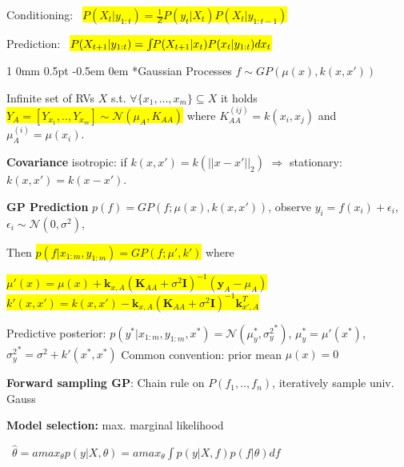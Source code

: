 \documentclass[11pt,landscape,a4paper,fleqn]{article}
\makeatletter
\newcommand*{\rsection}{%
	\@startsection{section}%
	{1}%
	{0mm}%
	{0.5pt}%
	{-0.5em \@plus 0em}
	{\color{myorange}\sffamily\small\bfseries}}
\newcommand{\mhl}[1]{\setlength{\fboxsep}{0pt}\colorbox{yellow}{#1}}
\makeatother
\begin{document}
\begin{multicols*}{4}
		Conditioning:
		\mbox{\fontsize{9}{6}\selectfont
			\mhl{$P(X_t | y_{1:t}) = \frac{1}{Z} P(y_t | X_t) P(X_t | y_{1:t-1})$}
		}

		Prediction:
		\mbox{\fontsize{9}{6}\selectfont
			\mhl{$P(X_{t+1} | y_{1:t}) = \int \hspace*{-1mm} P(X_{t+1} | x_t) P(x_t | y_{1:t}) dx_t$}
		}

		\rsection*{Gaussian Processes} $f \sim GP(\mu(x), k(x, x'))$ %

		Infinite set of RVs $X$ s.t. $\forall \{x_1, \dots, x_m\} \subseteq X$
		it holds \mhl{$Y_A = [Y_{x_1},..,Y_{x_m}] \sim \mathcal{N}(\mu_A, K_{AA})$} where
	$K_{AA}^{(ij)} = k(x_i, x_j)$ and $\mu_A^{(i)} = \mu(x_i)$.


		\textbf{Covariance} %
		isotropic: if $k(x,x') = k(||x - x'||_2)$ $\Rightarrow$ stationary: $k(x,x') = k(x - x')$.



		\textbf{GP Prediction} $p(f) = GP(f; \mu(x), k(x,x'))$, observe $y_i = f(x_i) + \epsilon_i$, $\epsilon_i \sim \mathcal{N}(0, \sigma^2)$,


		Then \mhl{$p(f | x_{1:m}, y_{1:m}) = GP(f; \mu', k')$} where

		\mhl{$\mu'(x) = \mu(x) + \mathbf{k}_{x,A} (\mathbf{K}_{AA} + \sigma^2 \mathbf{I})^{-1} (\mathbf{y}_A - \mu_A)$}
		\mhl{$k'(x,x') = k(x, x') - \mathbf{k}_{x,A} (\mathbf{K}_{AA} + \sigma^2 \mathbf{I})^{-1} \mathbf{k}_{x',A}^T$}

		Predictive posterior: $p(y^* | x_{1:m}, y_{1:m},x^*) = \mathcal{N}(\mu_y^*, {\sigma_y^2}^*)$, $\mu_y^* = \mu'(x^*)$, ${\sigma_y^2}^* = \sigma^2 + k'(x^*, x^*)$
		Common convention: prior mean $\mu(x) = 0$

		\textbf{Forward sampling GP}: Chain rule on $P(f_1,..,f_n)$, iteratively sample univ. Gauss

		\textbf{Model selection:} max. marginal likelihood

		\mbox{\fontsize{9}{6}\selectfont
			$\hat{\theta} = amax_\theta p(y | X, \theta) = amax_\theta \int p(y | X,f) p(f | \theta) df$
		}



\end{multicols*}
\end{document}

